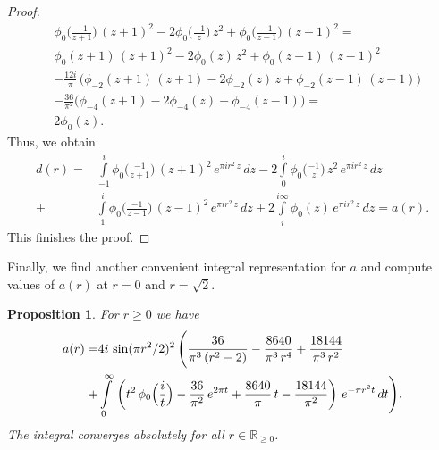 \documentclass{scrartcl}
\newcommand{\R}{\mathbb{R}}
\newtheorem{proposition}{Proposition}
\begin{document}
\begin{proof}
\begin{align*}&\phi_0\Big(\frac{-1}{z+1}\Big)\,(z+1)^2-2\phi_0\Big(\frac{-1}{z}\Big)\,z^2+
\phi_0\Big(\frac{-1}{z-1}\Big)\,(z-1)^2=\\
&\phi_0(z+1)\,(z+1)^2-2\phi_0(z)\,z^2+\phi_0(z-1)\,(z-1)^2\\
&-\frac{12i}{\pi}\,\Big(\phi_{-2}(z+1)\,(z+1)-2\phi_{-2}(z)\,z+\phi_{-2}(z-1)\,(z-1)\Big)\\
&-\frac{36}{\pi^2}\Big(\phi_{-4}(z+1)-2\phi_{-4}(z)+\phi_{-4}(z-1)\Big)=\\
&2\phi_0(z).
 \end{align*}
 Thus, we obtain
 \begin{align*}
 d(r)=&\int\limits_{-1}^{i}\phi_0\Big(\frac{-1}{z+1}\Big)\,(z+1)^2\,e^{\pi i r^2 \,z}\,dz
 -2\int\limits_{0}^{i}\phi_0\Big(\frac{-1}{z}\Big)\,z^2\,e^{\pi i r^2 \,z}\,dz\\
 +&\int\limits_{1}^{i}\phi_0\Big(\frac{-1}{z-1}\Big)\,(z-1)^2\,e^{\pi i r^2 \,z}\,dz
 +2\int\limits_{i}^{i\infty}\phi_0(z)\,e^{\pi i r^2 \,z}\,dz=a(r).
\end{align*}
This finishes the proof.
\end{proof}
Finally, we find another convenient integral representation for $a$ and compute values of $a(r)$ at $r=0$ and $r=\sqrt{2}$.
\begin{proposition}\label{prop: a another integral}
For $r\geq0$ we have
\begin{align}\label{eqn: a another integral}a(r)=&4i\,\sin(\pi r^2/2)^2\,\Bigg(\frac{36}{\pi^3\,(r^2-2)}-\frac{8640}{\pi^3\,r^4}+\frac{18144}{\pi^3\,r^2}\\ +&\int\limits_0^\infty\,\left(t^2\,\phi_0\Big(\frac{i}{t}\Big)-\frac{36}{\pi^2}\,e^{2\pi t}+\frac{8640}{\pi}\,t-\frac{18144}{\pi^2}\right)\,e^{-\pi r^2 t}\,dt \Bigg) .\notag\end{align}
The integral converges absolutely for all $r\in\R_{\geq 0}$.
\end{proposition}
\end{document}
